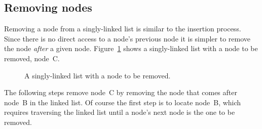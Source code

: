 \documentclass{article}
\begin{document}
  \subsection{Removing nodes}
  Removing a node from a singly-linked list is similar to the insertion process. Since there is no direct access to a node's previous node it is simpler to remove the node \emph{after} a given node.
  Figure~\ref{fig:singlelinkedlist-beforeremove} shows a singly-linked list with a node to be removed, node~C.
  \begin{figure}[H]
    \centering
    \caption{A singly-linked list with a node to be removed.}
    \label{fig:singlelinkedlist-beforeremove}
  \end{figure}

  The following steps remove node~C by removing the node that comes after node~B in the linked list. Of course the first step is to locate node~B, which requires traversing the linked list until a node's next node is the one to be removed.
\end{document}
